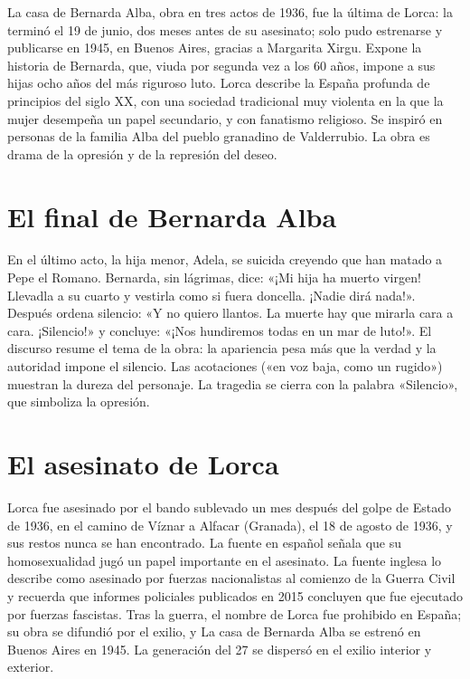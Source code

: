 \documentclass{book}
\begin{document}
La casa de Bernarda Alba, obra en tres actos de 1936, fue la última de Lorca: la terminó el 19 de junio, dos meses antes de su asesinato; solo pudo estrenarse y publicarse en 1945, en Buenos Aires, gracias a Margarita Xirgu. Expone la historia de Bernarda, que, viuda por segunda vez a los 60 años, impone a sus hijas ocho años del más riguroso luto. Lorca describe la España profunda de principios del siglo XX, con una sociedad tradicional muy violenta en la que la mujer desempeña un papel secundario, y con fanatismo religioso. Se inspiró en personas de la familia Alba del pueblo granadino de Valderrubio. La obra es drama de la opresión y de la represión del deseo.


\section{El final de Bernarda Alba}

En el último acto, la hija menor, Adela, se suicida creyendo que han matado a Pepe el Romano. Bernarda, sin lágrimas, dice: «¡Mi hija ha muerto virgen! Llevadla a su cuarto y vestirla como si fuera doncella. ¡Nadie dirá nada!». Después ordena silencio: «Y no quiero llantos. La muerte hay que mirarla cara a cara. ¡Silencio!» y concluye: «¡Nos hundiremos todas en un mar de luto!». El discurso resume el tema de la obra: la apariencia pesa más que la verdad y la autoridad impone el silencio. Las acotaciones («en voz baja, como un rugido») muestran la dureza del personaje. La tragedia se cierra con la palabra «Silencio», que simboliza la opresión.


\section{El asesinato de Lorca}

Lorca fue asesinado por el bando sublevado un mes después del golpe de Estado de 1936, en el camino de Víznar a Alfacar (Granada), el 18 de agosto de 1936, y sus restos nunca se han encontrado. La fuente en español señala que su homosexualidad jugó un papel importante en el asesinato. La fuente inglesa lo describe como asesinado por fuerzas nacionalistas al comienzo de la Guerra Civil y recuerda que informes policiales publicados en 2015 concluyen que fue ejecutado por fuerzas fascistas. Tras la guerra, el nombre de Lorca fue prohibido en España; su obra se difundió por el exilio, y La casa de Bernarda Alba se estrenó en Buenos Aires en 1945. La generación del 27 se dispersó en el exilio interior y exterior.
\end{document}
